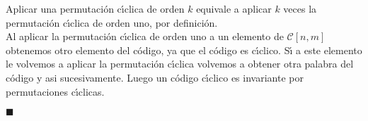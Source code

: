 Aplicar una permutaci\'on c\'{\i}clica de orden $k$ equivale a aplicar $k$
veces la permutaci\'on c\'{\i}clica de orden uno, por definici\'on.\\

Al aplicar la permutaci\'on c\'{\i}clica de orden uno a un elemento de
$\mathcal{C}[n,m]$ obtenemos otro elemento del c\'odigo, ya que el c\'odigo
es c\'{\i}clico. S\'{\i} a este elemento le volvemos a aplicar la permutaci\'on
c\'{\i}clica volvemos a obtener otra palabra del c\'odigo y asi sucesivamente.
Luego un c\'odigo c\'{\i}clico es invariante por permutaciones c\'{\i}clicas.
\begin{flushright}
$\blacksquare$
\end{flushright}

%
%



%
%



%
%



%
%



